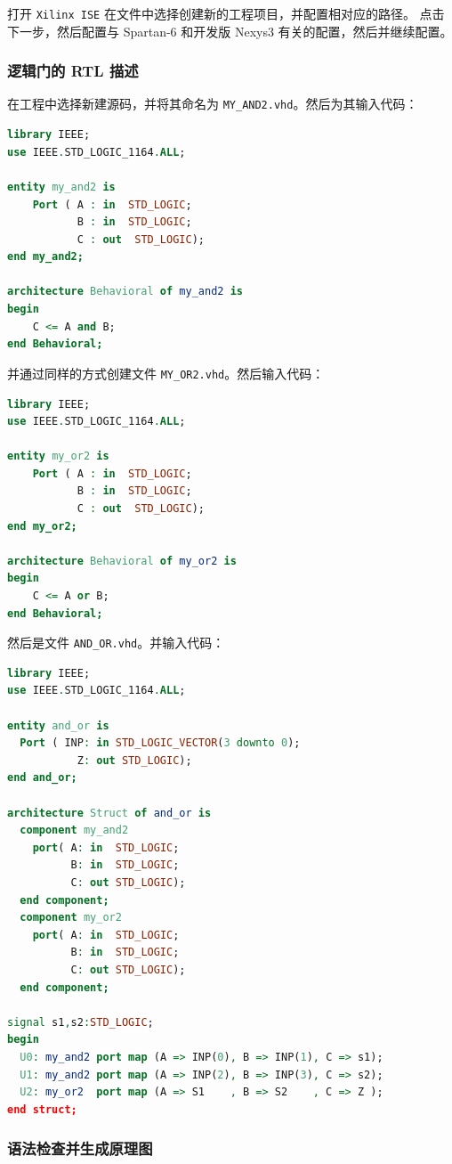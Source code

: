 \documentclass{ctexart}
\begin{document}
打开 \verb|Xilinx ISE| 在文件中选择创建新的工程项目，并配置相对应的路径。
点击下一步，然后配置与 Spartan-6 和开发版 Nexys3 有关的配置，然后并继续配置。

\subsubsection{逻辑门的 RTL 描述}

在工程中选择新建源码，并将其命名为 \verb|MY_AND2.vhd|。然后为其输入代码：
\begin{lstlisting}[language=VHDL]
library IEEE;
use IEEE.STD_LOGIC_1164.ALL;

entity my_and2 is
    Port ( A : in  STD_LOGIC;
           B : in  STD_LOGIC;
           C : out  STD_LOGIC);
end my_and2;

architecture Behavioral of my_and2 is
begin
	C <= A and B;
end Behavioral;
\end{lstlisting}

并通过同样的方式创建文件 \verb|MY_OR2.vhd|。然后输入代码：
\begin{lstlisting}[language=VHDL]
library IEEE;
use IEEE.STD_LOGIC_1164.ALL;

entity my_or2 is
    Port ( A : in  STD_LOGIC;
           B : in  STD_LOGIC;
           C : out  STD_LOGIC);
end my_or2;

architecture Behavioral of my_or2 is
begin
	C <= A or B;
end Behavioral;
\end{lstlisting}

然后是文件 \verb|AND_OR.vhd|。并输入代码：
\begin{lstlisting}[language=VHDL]
library IEEE;
use IEEE.STD_LOGIC_1164.ALL;

entity and_or is
  Port ( INP: in STD_LOGIC_VECTOR(3 downto 0);
           Z: out STD_LOGIC);
end and_or;

architecture Struct of and_or is
  component my_and2
    port( A: in  STD_LOGIC;
          B: in  STD_LOGIC;
          C: out STD_LOGIC);
  end component;
  component my_or2
    port( A: in  STD_LOGIC;
          B: in  STD_LOGIC;
          C: out STD_LOGIC);
  end component;

signal s1,s2:STD_LOGIC;
begin
  U0: my_and2 port map (A => INP(0), B => INP(1), C => s1);
  U1: my_and2 port map (A => INP(2), B => INP(3), C => s2);
  U2: my_or2  port map (A => S1    , B => S2    , C => Z );
end struct;
\end{lstlisting}

\subsubsection{语法检查并生成原理图}
\end{document}
